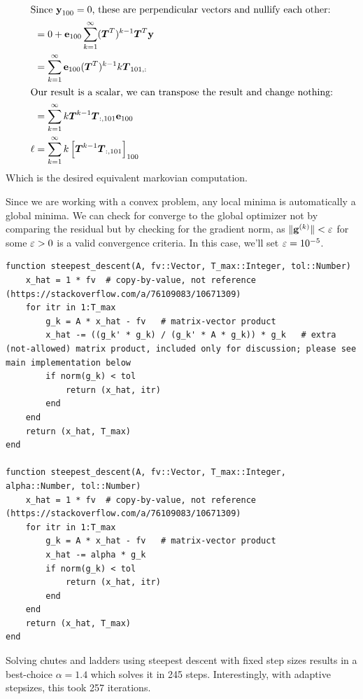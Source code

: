 \documentclass[]{exam}
\begin{document}
\begin{questions}
\begin{enumerate}[label=\arabic*.]
\begin{align*}
			\intertext{Since $\boldsymbol{\mathrm{y}}_{100} = 0$, these are perpendicular vectors and nullify each other:}
			&= 0 + \boldsymbol{\mathrm{e}}_{100} \sum^\infty_{k=1} (\boldsymbol{T}^T)^{k - 1} \boldsymbol{T}^T \boldsymbol{\mathrm{y}} \\
			&= \sum^\infty_{k=1} \boldsymbol{\mathrm{e}}_{100} (\boldsymbol{T}^T)^{k - 1} k \boldsymbol{T}_{101, :} \\
			\intertext{Our result is a scalar, we can transpose the result and change nothing:}
			&= \sum^\infty_{k=1} k \boldsymbol{T}^{k - 1} \boldsymbol{T}_{:, 101} \boldsymbol{\mathrm{e}}_{100} \\
			\ell &= \sum^\infty_{k=1} k \left[\boldsymbol{T}^{k - 1} \boldsymbol{T}_{:, 101}\right]_{100} \\
		\end{align*}
		Which is the desired equivalent markovian computation.
\end{enumerate}

\newpage
\question
\hfill

Since we are working with a convex problem, any local minima is automatically a global minima. We can check for converge to the global optimizer not by comparing the residual but by checking for the gradient norm, as $\| \boldsymbol{\mathrm{g}}^{(k)} \| < \varepsilon$ for some $\varepsilon > 0$ is a valid convergence criteria. In this case, we'll set $\varepsilon = 10^{-5}$.

\begin{lstlisting}
function steepest_descent(A, fv::Vector, T_max::Integer, tol::Number)
	x_hat = 1 * fv  # copy-by-value, not reference (https://stackoverflow.com/a/76109083/10671309)
	for itr in 1:T_max
		g_k = A * x_hat - fv   # matrix-vector product
		x_hat -= ((g_k' * g_k) / (g_k' * A * g_k)) * g_k   # extra (not-allowed) matrix product, included only for discussion; please see main implementation below
		if norm(g_k) < tol
			return (x_hat, itr)
		end
	end
	return (x_hat, T_max)
end

function steepest_descent(A, fv::Vector, T_max::Integer, alpha::Number, tol::Number)
	x_hat = 1 * fv  # copy-by-value, not reference (https://stackoverflow.com/a/76109083/10671309)
	for itr in 1:T_max
		g_k = A * x_hat - fv   # matrix-vector product
		x_hat -= alpha * g_k
		if norm(g_k) < tol
			return (x_hat, itr)
		end
	end
	return (x_hat, T_max)
end
\end{lstlisting}

Solving chutes and ladders using steepest descent with fixed step sizes results in a best-choice $\alpha = 1.4$ which solves it in 245 steps. Interestingly, with adaptive stepsizes, this took 257 iterations.


\end{questions}
\end{document}
